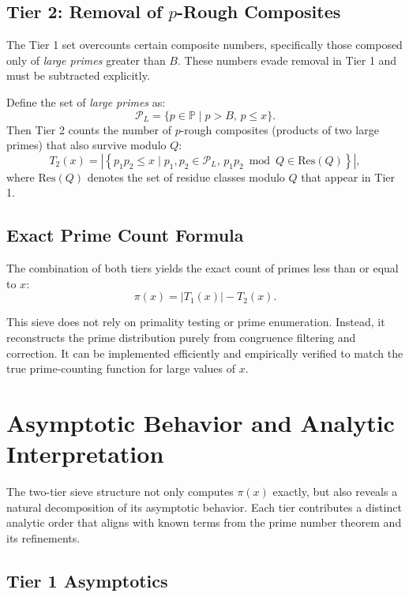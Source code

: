 \documentclass[11pt]{article}
\begin{document}
	\subsection{Tier 2: Removal of \texorpdfstring{$p$}{p}-Rough Composites}
	
	The Tier 1 set overcounts certain composite numbers, specifically those composed only of \textit{large primes} greater than $B$. These numbers evade removal in Tier 1 and must be subtracted explicitly.
	
	Define the set of \textit{large primes} as:
	\[
	\mathcal{P}_L = \{p \in \mathbb{P} \mid p > B, \, p \leq x\}.
	\]
	Then Tier 2 counts the number of $p$-rough composites (products of two large primes) that also survive modulo $Q$:
	\[
	T_2(x) = \left| \left\{ p_1 p_2 \leq x \mid p_1, p_2 \in \mathcal{P}_L, \, p_1 p_2 \bmod Q \in \text{Res}(Q) \right\} \right|,
	\]
	where $\text{Res}(Q)$ denotes the set of residue classes modulo $Q$ that appear in Tier 1.
	
	\subsection{Exact Prime Count Formula}
	
	The combination of both tiers yields the exact count of primes less than or equal to $x$:
	\[
	\pi(x) = |T_1(x)| - T_2(x).
	\]
	
	This sieve does not rely on primality testing or prime enumeration. Instead, it reconstructs the prime distribution purely from congruence filtering and correction. It can be implemented efficiently and empirically verified to match the true prime-counting function for large values of $x$.
	
	
	
	\section{Asymptotic Behavior and Analytic Interpretation}
	
	The two-tier sieve structure not only computes $\pi(x)$ exactly, but also reveals a natural decomposition of its asymptotic behavior. Each tier contributes a distinct analytic order that aligns with known terms from the prime number theorem and its refinements.
	
	
	
	\subsection{Tier 1 Asymptotics}
	
\end{document}
